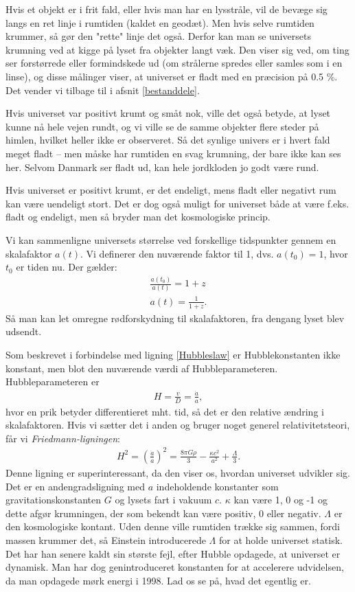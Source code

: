 Hvis et objekt er i frit fald, eller hvis man har en lysstråle, vil de bevæge sig langs en ret linje i rumtiden (kaldet en geodæt). Men hvis selve rumtiden krummer, så gør den "rette"  linje det også. Derfor kan man se universets krumning ved at kigge på lyset fra objekter langt væk. Den viser sig ved, om ting ser forstørrede eller formindskede ud (om strålerne spredes eller samles som i en linse), og disse målinger viser, at universet er fladt med en præcision på 0.5 \%. Det vender vi tilbage til i afsnit \ref{bestanddele}. %

Hvis universet var positivt krumt og småt nok, ville det også betyde, at lyset kunne nå hele vejen rundt, og vi ville se de samme objekter flere steder på himlen, hvilket heller ikke er observeret. Så det synlige univers er i hvert fald meget fladt -- men måske har rumtiden en svag krumning, der bare ikke kan ses her. Selvom Danmark ser fladt ud, kan hele jordkloden jo godt være rund.

Hvis universet er positivt krumt, er det endeligt, mens fladt eller negativt rum kan være uendeligt stort. Det er dog også muligt for universet både at være f.eks. fladt og endeligt, men så bryder man det kosmologiske princip.

Vi kan sammenligne universets størrelse ved forskellige tidspunkter gennem en skalafaktor $a(t)$. Vi definerer den nuværende faktor til 1, dvs. $a(t_0)=1$, hvor $t_0$ er tiden nu. Der gælder:
\begin{align}
\frac{a(t_0)}{a(t)}=1+z\\
a(t)=\frac{1}{1+z}.
\end{align}
Så man kan let omregne rødforskydning til skalafaktoren, fra dengang lyset blev udsendt.

Som beskrevet %
i forbindelse med ligning \ref{Hubbleslaw} er Hubblekonstanten ikke konstant, men blot den nuværende værdi af Hubbleparameteren. Hubbleparameteren er
\begin{align}
H=\frac{v}{D}=\frac{\dot{a}}{a},
\end{align}
hvor en prik betyder differentieret mht. tid, så det er den relative ændring i skalafaktoren. Hvis vi sætter det i anden og bruger noget generel relativitetsteori, får vi \emph{Friedmann-ligningen}:
\begin{align}
H^2=\left(\frac{\dot{a}}{a}\right)^2=\frac{8\pi G \rho}{3}-\frac{\kappa c^2}{a^2}+\frac{\Lambda}{3}. \label{friedmann}
\end{align}
Denne ligning er superinteressant, da den viser os, hvordan universet udvikler sig. Det er en andengradsligning med $a$ indeholdende konstanter som gravitationskonstanten $G$ og lysets fart i vakuum $c$. $\kappa$ kan være 1, 0 og -1 og dette afgør krumningen, der som bekendt kan være positiv, 0 eller negativ. $\Lambda$ er den kosmologiske kontant. Uden denne ville rumtiden trække sig sammen, fordi massen krummer det, så Einstein introducerede $\Lambda$ for at holde universet statisk. Det har han senere kaldt sin største fejl, efter Hubble opdagede, at universet er dynamisk. Man har dog genintroduceret konstanten for at accelerere udvidelsen, da man opdagede mørk energi i 1998. Lad os se på, hvad det egentlig er.

